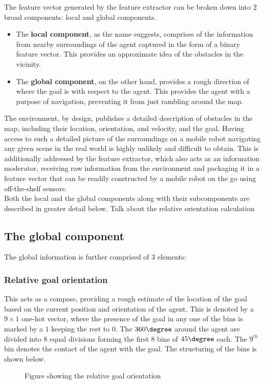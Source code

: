 The feature vector generated by the feature extractor can be broken down into 2 broad components: local and global components.
\begin{itemize}
	\item The \textbf{local component}, as the name suggests, comprises of the information from nearby surroundings of the agent captured in the form of a binary feature vector. This provides an approximate idea of the obstacles in the vicinity.
	\item The \textbf{global component}, on the other hand, provides a rough direction of where the goal is with respect to the agent. This provides the agent with a purpose of navigation, preventing it from just rambling around the map.
\end{itemize}
 The environment, by design, publishes a detailed description of obstacles in the map, including their location, orientation, and velocity, and the goal. Having access to such a detailed picture of the surroundings on a mobile robot navigating any given scene in the real world is highly unlikely and difficult to obtain. This is additionally addressed by the feature extractor, which also acts as an information moderator, receiving raw information from the environment and packaging it in a feature vector that can be readily constructed by a mobile robot on the go using off-the-shelf sensors.\\
 Both the local and the global components along with their subcomponents are described in greater detail below.
Talk about the relative orientation calculation


\subsection*{The global component}
The global information is further comprised of 3 elements:

\subsubsection*{Relative goal orientation} 
This acts as a compass, providing a rough estimate of the location of the goal based on the current position and orientation of the agent. This is denoted by a $9 \times 1$ one-hot vector, where the presence of the goal in any one of the bins is marked by a $1$ keeping the rest to $0$. The $360 \degree$ around the agent are divided into $8$ equal divisions forming the first 8 bins of $45 \degree$ each. The $9^{th}$ bin denotes the contact of the agent with the goal. The structuring of the bins is shown below. 
\begin{figure}[!htbp]
	Figure showing the relative goal orientation
\end{figure}

